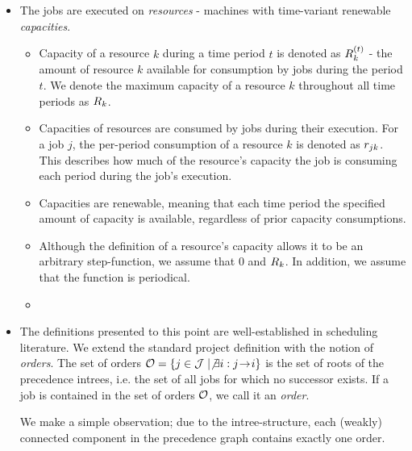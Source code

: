 \begin{itemize}
\begin{itemize}
        \item The jobs are executed on \emph{resources} - machines with time-variant renewable \emph{capacities}.
        \begin{itemize}
            \item Capacity of a resource $k$ during a time period $t$ is denoted as $\capacity{k}{t}$ - the amount
                of resource $k$ available for consumption by jobs during the period $t$.
                We denote the maximum capacity of a resource $k$ throughout all time periods as $\maxcapacity{k}$.

            \item Capacities of resources are consumed by jobs during their execution. For a job $j$,
                the per-period consumption of a resource $k$ is denoted as $\consumption{j}{k}$. This describes how much
                of the resource's capacity the job is consuming each period during the job's execution.

            \item Capacities are renewable, meaning that each time period the specified amount of capacity is available,
            regardless of prior capacity consumptions.

            \item {} Although the definition of a resource's capacity allows it
                to be an arbitrary step-function, we assume that  $0$ and $\maxcapacity{k}$.
                In addition, we assume that the function is periodical.

            \item {}
        \end{itemize}

        \item The definitions presented to this point are well-established in scheduling
            literature. We extend the standard project definition with the notion of \emph{orders}.
            The set of orders  $\Orders = \{ j \in \Jobs \mid \not\exists i : \precedence{j}{i} \}$
            is the set of roots of the precedence intrees, i.e. the set of all jobs for which
            no successor exists. If a job is contained in the set of orders $\Orders$, we call it an \emph{order}.

            We make a simple observation; due to the intree-structure, each (weakly) connected component
            in the precedence graph contains exactly one order. 


\end{itemize}
\end{itemize}
